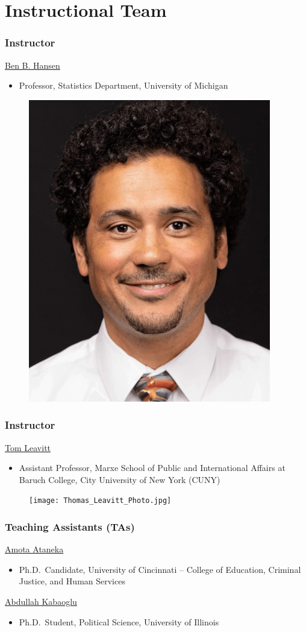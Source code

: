 \documentclass[table, xcolor = {dvipsnames}, 9pt]{beamer}
\theoremstyle{plain}
\begin{document}
\section{Instructional Team}
\begin{frame}[t]
\frametitle{Instructor}
\vfill
\href{https://dept.stat.lsa.umich.edu/~bbh/}{Ben B. Hansen}
\begin{itemize} \vfill
\item Professor, Statistics Department, University of Michigan
\end{itemize} \vfill
\begin{figure}[H]
\includegraphics[width=0.45\linewidth]{Ben_Hansen_Photo.png}%
\end{figure}
\vfill
\end{frame}
\begin{frame}[t]
\frametitle{Instructor}
\vfill
\href{https://www.tomleavitt.com/}{Tom Leavitt}
\begin{itemize} \vfill
\item Assistant Professor, Marxe School of Public and International Affairs at Baruch College, City University of New York (CUNY)
\end{itemize} \vfill
\begin{figure}[H]
\texttt{[image: Thomas\_Leavitt\_Photo.jpg]}%
\end{figure}
\vfill
\end{frame}
\begin{frame}[t]
\frametitle{Teaching Assistants (TAs)}
\vfill
\href{https://researchdirectory.uc.edu/p/atanekaa}{Amota Ataneka} \vfill
\begin{itemize} \vfill
\item Ph.D.~Candidate, University of Cincinnati -- College of Education, Criminal Justice, and Human Services \vfill
\end{itemize} \vfill
\href{https://pol.illinois.edu/directory/profile/ak72}{Abdullah Kabaoglu} \vfill
\begin{itemize} \vfill
\item Ph.D.~Student, Political Science, University of Illinois
\end{itemize} \vfill
\vfill
\end{frame}
\end{document}

